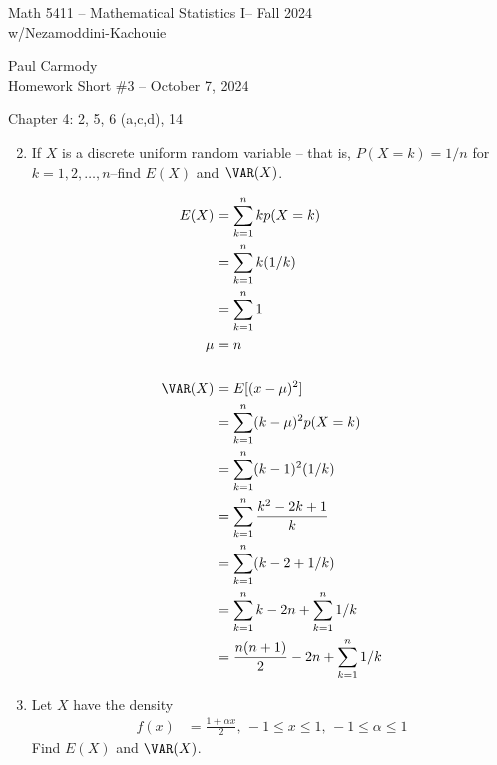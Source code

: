 \documentclass[10pt,a4paper]{report}
\newcommand{\CLASSNAME}{Math 5411 -- Mathematical Statistics I}
\newcommand{\PROFESSOR}{Nezamoddini-Kachouie}
\newcommand{\STUDENTNAME}{Paul Carmody}
\newcommand{\ASSIGNMENT}{Homework Short \#3 }
\newcommand{\DUEDATE}{October 7, 2024}
\newcommand{\SEMESTER}{Fall 2024}
\begin{document}
\begin{center}
	\Large{\CLASSNAME -- \SEMESTER} \\
	\large{w/\PROFESSOR}
\end{center}
\begin{center}
	\STUDENTNAME \\
	\ASSIGNMENT -- \DUEDATE\\
\end{center}

Chapter 4: 2, 5, 6 (a,c,d), 14
\begin{enumerate}
	\setcounter{enumi}{1}
	\item If $X$ is a discrete uniform random variable -- that is, $P(X=k)=1/n$ for $k=1,2,\dots,n$--find $E(X)$ and $\VAR(X)$.
	
	\begin{align*}
		E(X) &= \sum_{k=1}^n kp(X=k)\\
		&=  \sum_{k=1}^n k(1/k) \\
		&=  \sum_{k=1}^n 1 \\
		\mu &= n\\
		\\	
		\VAR(X) &= E[(x - \mu)^2]\\
		&=  \sum_{k=1}^n (k-\mu)^2p(X=k) \\
		&=  \sum_{k=1}^n (k-1)^2(1/k) \\
		&=  \sum_{k=1}^n \frac{k^2-2k+1}{k}\\
		&=  \sum_{k=1}^n (k-2+1/k) \\
		&= 	\sum_{k=1}^n k -2n + \sum_{k=1}^n1/k \\
		&= \frac{n(n+1)}{2}	-2n + \sum_{k=1}^n1/k
	\end{align*}
	\setcounter{enumi}{4}
	\newpage
	\item Let $X$ have the density 
	\begin{align*}
		f(x) &= \frac{1+\alpha x}{2}, \, -1 \le x \le 1, \, -1\le \alpha \le 1
	\end{align*}Find $E(X)$ and $\VAR(X)$.
	

\end{enumerate}
\end{document}
